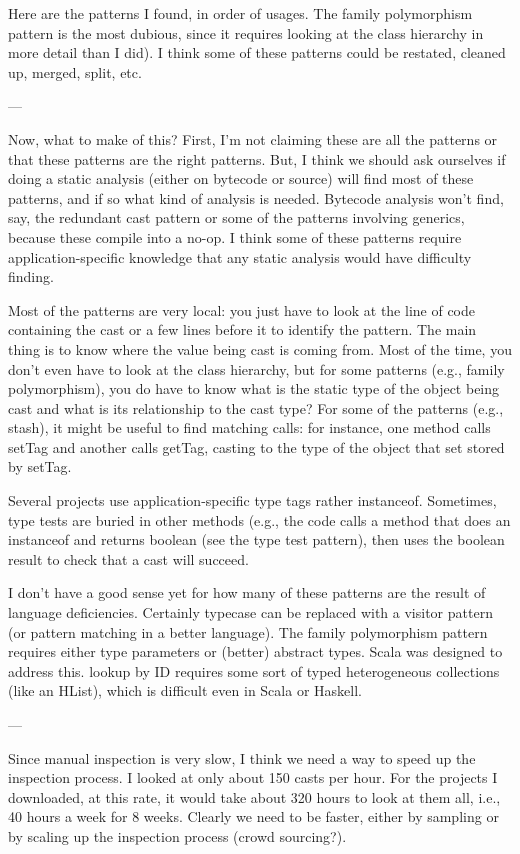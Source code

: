\documentclass{usiinfdocprop}
\begin{document}
Here are the patterns I found, in order of usages. 
The family polymorphism pattern is the most dubious, since it requires looking at the class hierarchy in more detail than I did). 
I think some of these patterns could be restated, cleaned up, merged, split, etc. 

--- 

Now, what to make of this? 
First, I'm not claiming these are all the patterns or that these patterns are the right patterns. 
But, I think we should ask ourselves if doing a static analysis (either on bytecode or source) will find most of these patterns, and if so what kind of analysis is needed. 
Bytecode analysis won't find, say, the redundant cast pattern or some of the patterns involving generics, because these compile into a no-op. 
I think some of these patterns require application-specific knowledge that any static analysis would have difficulty finding. 

Most of the patterns are very local: 
you just have to look at the line of code containing the cast or a few lines before it to identify the pattern. 
The main thing is to know where the value being cast is coming from. 
Most of the time, you don't even have to look at the class hierarchy, but for some patterns (e.g., family polymorphism), you do have to know what is the static type of the object being cast and what is its relationship to the cast type? 
For some of the patterns (e.g., stash), it might be useful to find matching calls: 
for instance, one method calls setTag and another calls getTag, casting to the type of the object that set stored by setTag. 

Several projects use application-specific type tags rather instanceof. 
Sometimes, type tests are buried in other methods (e.g., the code calls a method that does an instanceof and returns boolean (see the type test pattern), then uses the boolean result to check that a cast will succeed. 

I don't have a good sense yet for how many of these patterns are the result of language deficiencies. 
Certainly typecase can be replaced with a visitor pattern (or pattern matching in a better language). 
The family polymorphism pattern requires either type parameters or (better) abstract types. 
Scala was designed to address this. 
lookup by ID requires some sort of typed heterogeneous collections (like an HList), which is difficult even in Scala or Haskell. 

--- 

Since manual inspection is very slow, I think we need a way to speed up the inspection process. 
I looked at only about 150 casts per hour. 
For the projects I downloaded, at this rate, it would take about 320 hours to look at them all, i.e., 40 hours a week for 8 weeks. 
Clearly we need to be faster, either by sampling or by scaling up the inspection process (crowd sourcing?). 
\end{document}

